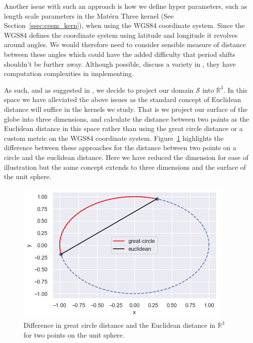 Another issue with such an approach is how we define hyper parameters, such as length scale parameters in the Mat\'ern Three kernel (See Section~\ref{ssec:cesm_kern}), when using the WGS84 coordinate system.
Since the WGS84 defines the coordinate system using latitude and longitude it revolves around angles.
We would therefore need to consider sensible measure of distance between these angles which could have the added difficulty that period shifts shouldn't be further away.
Although possible, \citeauthor{guinness_isotropic_2016} discuss a variety in \citep{guinness_isotropic_2016}, they have computation complexities in implementing.

As such, and as suggested in \citep{guinness_isotropic_2016}, we decide to project our domain $\mathcal{S}$ into $\mathbb{R}^3$.
In this space we have alleviated the above issues as the standard concept of Euclidean distance will suffice in the kernels we study.
That is we project our surface of the globe into three dimensions, and calculate the distance between two points as the Euclidean distance in this space rather than using the great circle distance or a custom metric on the WGS84 coordinate system. 
Figure~\ref{fig:spatial_projection} highlights the difference between these approaches for the distance between two points on a circle and the euclidean distance.
Here we have reduced the dimension for ease of illustration but the same concept extends to three dimensions and the surface of the unit sphere. 

\begin{figure}[h]
	\centering
	\includegraphics[width=\textwidth]{spatial_projection}
	\caption{Difference in great circle distance and the Euclidean distance in $\mathbb{R}^3$ for two points on the unit sphere.}
	\label{fig:spatial_projection}
\end{figure}

